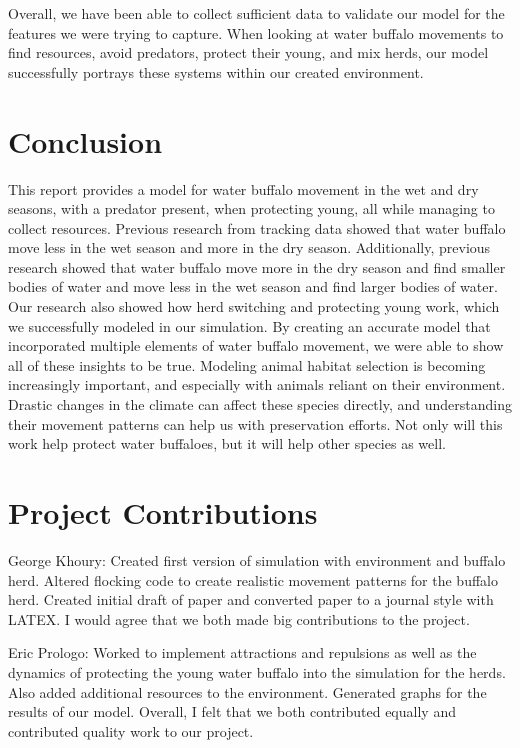 \documentclass[12pt]{article}
\begin{document}
Overall, we have been able to collect sufficient data to validate our model for the features we were trying to capture. When looking at water buffalo movements to find resources, avoid predators, protect their young, and mix herds, our model successfully portrays these systems within our created environment.

\section*{Conclusion}

This report provides a model for water buffalo movement in the wet and dry seasons, with a predator present, when protecting young, all while managing to collect resources. Previous research from tracking data showed that water buffalo move less in the wet season and more in the dry season. Additionally, previous research showed that water buffalo move more in the dry season and find smaller bodies of water and move less in the wet season and find larger bodies of water. Our research also showed how herd switching and protecting young work, which we successfully modeled in our simulation. By creating an accurate model that incorporated multiple elements of water buffalo movement, we were able to show all of these insights to be true. Modeling animal habitat selection is becoming increasingly important, and especially with animals reliant on their environment. Drastic changes in the climate can affect these species directly, and understanding their movement patterns can help us with preservation efforts. Not only will this work help protect water buffaloes, but it will help other species as well.

\section*{Project Contributions}

George Khoury: Created first version of simulation with environment and buffalo herd. Altered flocking code to create realistic movement patterns for the buffalo herd. Created initial draft of paper and converted paper to a journal style with LATEX. I would agree that we both made big contributions to the project. 

Eric Prologo: Worked to implement attractions and repulsions as well as the dynamics of protecting the young water buffalo into the simulation for the herds. Also added additional resources to the environment. Generated graphs for the results of our model. Overall, I felt that we both contributed equally and contributed quality work to our project.
\end{document}
